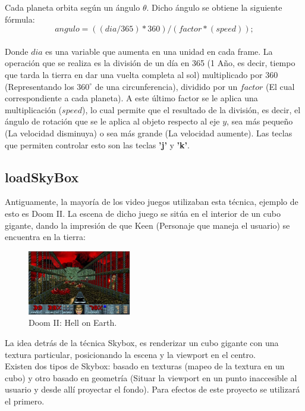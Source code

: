\documentclass[journal]{IEEEtran}
\begin{document}
Cada planeta orbita según un ángulo $\theta$. Dicho ángulo se obtiene la siguiente fórmula:\\

\[
	angulo = (( dia / 365)*360)/(factor*(speed));
\]\\

Donde $dia$ es una variable que aumenta en una unidad en cada frame. La operación que se realiza es la división de un día en 365 (1 Año, es decir, tiempo que tarda la tierra en dar una vuelta completa al sol) multiplicado por 360 (Representando los $360^{\circ}$ de una circunferencia), dividido por un $factor$ (El cual correspondiente a cada planeta). A este último factor se le aplica una multiplicación ($speed$), lo cual permite que el resultado de la división, es decir, el ángulo de rotación que se le aplica al objeto respecto al eje $y$, sea más pequeño (La velocidad disminuya) o sea más grande (La velocidad aumente). Las teclas que permiten controlar esto son las teclas \textbf{'j'} y \textbf{'k'}.

\subsection{loadSkyBox}

Antiguamente, la mayoría de los video juegos utilizaban esta técnica, ejemplo de esto es Doom II. La escena de dicho juego se sitúa en el interior de un cubo gigante, dando la impresión de que Keen (Personaje que maneja el usuario) se encuentra en la tierra:

\begin{figure}[h!]
	\includegraphics[width=0.4\textwidth, height=0.25\textwidth]{doom2.jpg}
	\centering
	\caption{Doom II: Hell on Earth.}
\end{figure}

La idea detrás de la técnica Skybox, es renderizar un cubo gigante con una textura particular, posicionando la escena y la viewport en el centro\cite{skybox2}.\\

Existen dos tipos de Skybox: basado en texturas (mapeo de la textura en un cubo) y otro basado en geometría (Situar la viewport en un punto inaccesible al usuario y desde allí proyectar el fondo). Para efectos de este proyecto se utilizará el primero.
\end{document}
